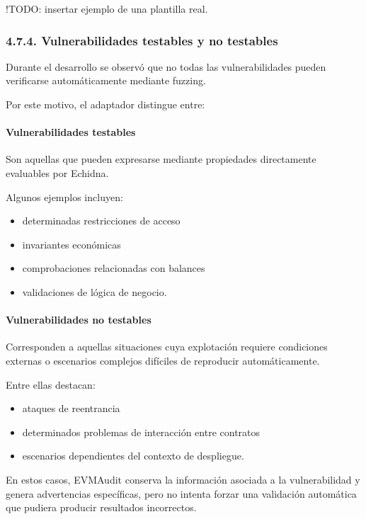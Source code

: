 !TODO: insertar ejemplo de una plantilla real.

\subsubsection{4.7.4. Vulnerabilidades testables y no
testables}\label{vulnerabilidades-testables-y-no-testables}

Durante el desarrollo se observó que no todas las vulnerabilidades
pueden verificarse automáticamente mediante fuzzing.

Por este motivo, el adaptador distingue entre:

\paragraph{Vulnerabilidades testables}\label{vulnerabilidades-testables}

Son aquellas que pueden expresarse mediante propiedades directamente
evaluables por Echidna.

Algunos ejemplos incluyen:

\begin{itemize}
\tightlist
\item
  determinadas restricciones de acceso
\item
  invariantes económicas
\item
  comprobaciones relacionadas con balances
\item
  validaciones de lógica de negocio.
\end{itemize}

\paragraph{Vulnerabilidades no
testables}\label{vulnerabilidades-no-testables}

Corresponden a aquellas situaciones cuya explotación requiere
condiciones externas o escenarios complejos difíciles de reproducir
automáticamente.

Entre ellas destacan:

\begin{itemize}
\tightlist
\item
  ataques de reentrancia
\item
  determinados problemas de interacción entre contratos
\item
  escenarios dependientes del contexto de despliegue.
\end{itemize}

En estos casos, EVMAudit conserva la información asociada a la
vulnerabilidad y genera advertencias específicas, pero no intenta forzar
una validación automática que pudiera producir resultados incorrectos.

